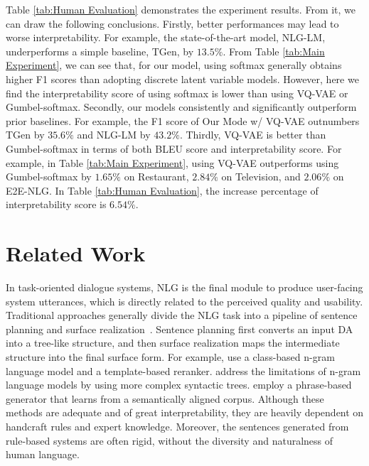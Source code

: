 \documentclass[letterpaper]{article} %
\begin{document}
	Table \ref{tab:Human Evaluation} demonstrates the experiment results. From it, we can draw the following conclusions. Firstly, better performances may lead to worse interpretability. For example, the state-of-the-art model, NLG-LM, underperforms a simple baseline, TGen, by $13.5\%$. From Table \ref{tab:Main Experiment}, we can see that, for our model, using softmax generally obtains higher F1 scores than adopting discrete latent variable models. However, here we find the interpretability score of using softmax is lower than using VQ-VAE or Gumbel-softmax. Secondly, our models consistently and significantly outperform prior baselines. For example, the F1 score of Our Mode w/ VQ-VAE outnumbers TGen by $35.6\%$ and NLG-LM by $43.2\%$. Thirdly, VQ-VAE is better than Gumbel-softmax in terms of both BLEU score and interpretability score. For example, in Table \ref{tab:Main Experiment}, using VQ-VAE outperforms using Gumbel-softmax by $1.65\%$ on Restaurant, $2.84\%$ on Television, and $2.06\%$ on E2E-NLG. In Table \ref{tab:Human Evaluation}, the increase percentage of interpretability score is $6.54\%$.

\section{Related Work}

	In task-oriented dialogue systems, NLG is the final module to produce user-facing system utterances, which is directly related to the perceived quality and usability. Traditional approaches generally divide the NLG task into a pipeline of sentence planning and surface realization~\citep{oh2000stochastic,ratnaparkhi2000trainable,mirkovic2011dialogue,cheyer2014method}. Sentence planning first converts an input DA into a tree-like structure, and then surface realization maps the intermediate structure into the final surface form. For example, \citet{oh2000stochastic} use a class-based n-gram language model and a template-based reranker. \citet{ratnaparkhi2000trainable} address the limitations of n-gram language models by using more complex syntactic trees. \citet{mairesse2014stochastic} employ a phrase-based generator that learns from a semantically aligned corpus. Although these methods are adequate and of great interpretability, they are heavily dependent on handcraft rules and expert knowledge. Moreover, the sentences generated from rule-based systems are often rigid, without the diversity and naturalness of human language.
\end{document}
